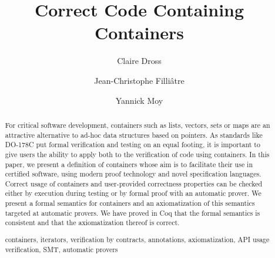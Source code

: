 \documentclass[runningheads,a4paper]{llncs}
\newcommand{\keywords}[1]{\par\addvspace\baselineskip
\noindent\keywordname\enspace\ignorespaces#1}
\begin{document}
\mainmatter  %

\title{Correct Code Containing Containers}


%
%
\author{Claire Dross\and Jean-Christophe Filli\^ atre\and Yannick Moy}


\maketitle

\begin{abstract}

  For critical software development, containers such as lists, vectors, sets or
  maps are an attractive alternative to ad-hoc data structures based on
  pointers.
  As standards like DO-178C put formal verification and testing on an equal
  footing, it is important to give users the ability to apply both to the
  verification of code using containers.
  In this paper,
  we present a definition of containers whose aim is to facilitate their
  use in certified software, using modern proof technology and novel
  specification languages. Correct usage of containers and user-provided
  correctness properties can be checked either by execution during testing
  or by formal proof with an automatic prover.
  We present a formal semantics for containers and an axiomatization of this
  semantics targeted at automatic provers. We have proved in Coq that the
  formal semantics is consistent and that the axiomatization thereof is correct.

  \keywords{containers, iterators, verification by contracts, annotations,
    axiomatization, API usage verification, SMT, automatic provers}
\end{abstract}
\end{document}
